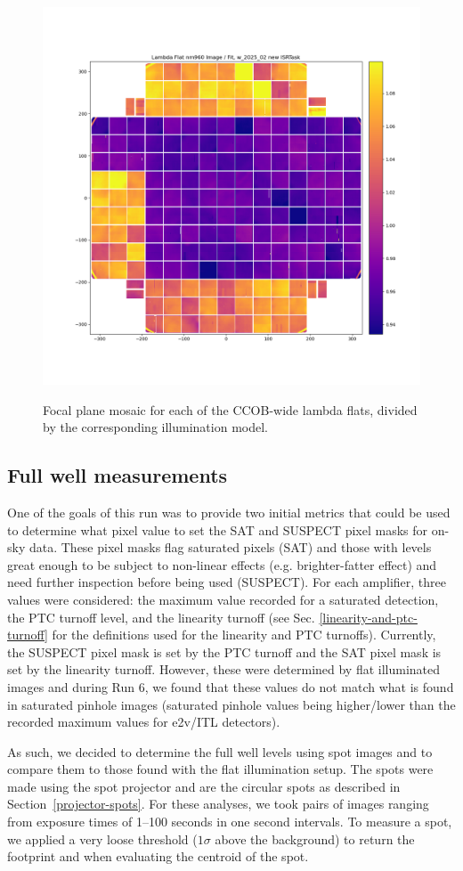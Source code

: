 \begin{figure}[ht]
    \includegraphics[width=0.4\linewidth]{figures/lambda_nm960_E2233.png} \\
    \caption{Focal plane mosaic for each of the CCOB-wide lambda flats, divided by the corresponding illumination model.}
    \label{fig:mosaic-relativeqe}
\end{figure}

\clearpage

\clearpage
\subsection{Full well measurements}\label{sec:bfullwellmeasurement}

One of the goals of this run was to provide two initial metrics that could be used to determine what pixel value to set the SAT and SUSPECT pixel masks for on-sky data. These pixel masks flag saturated pixels (SAT) and those with levels great enough to be subject to non-linear effects (e.g. brighter-fatter effect) and need further inspection before being used (SUSPECT). For each amplifier, three values were considered: the maximum value recorded for a saturated detection, the PTC turnoff level, and the linearity turnoff (see Sec. \ref{linearity-and-ptc-turnoff} for the definitions used for the linearity and PTC turnoffs). Currently, the SUSPECT pixel mask is set by the PTC turnoff and the SAT pixel mask is set by the linearity turnoff. However, these were determined by flat illuminated images and during Run 6, we found that these values do not match what is found in saturated pinhole images (saturated pinhole values being higher/lower than the recorded maximum values for e2v/ITL detectors).

As such, we decided to determine the full well levels using spot images and to compare them to those found with the flat illumination setup. The spots were made using the spot projector and are the circular spots as described in Section~\ref{projector-spots}. For these analyses, we took pairs of images ranging from exposure times of 1--100 seconds in one second intervals. To measure a spot, we applied a very loose threshold ($1\sigma$ above the background) to return the footprint and when evaluating the centroid of the spot.

